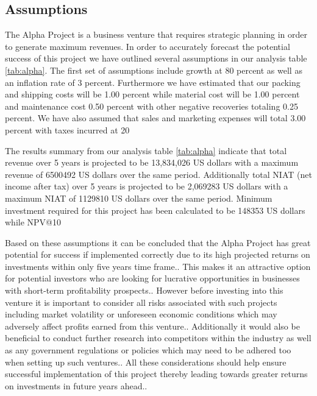 

\subsection{Assumptions}\label{sec:assumptions}
The Alpha Project is a business venture that requires strategic planning in order to generate maximum revenues. In order to accurately forecast the potential success of this project we have outlined several assumptions in our analysis table \ref{tab:alpha}. The first set of assumptions include growth at 80 percent as well as an inflation rate of 3 percent. Furthermore we have estimated that our packing and shipping costs will be 1.00 percent while material cost will be 1.00 percent and maintenance cost 0.50 percent with other negative recoveries totaling 0.25 percent. We have also assumed that sales and marketing expenses will total 3.00 percent with taxes incurred at 20%

The results summary from our analysis table \ref{tab:alpha} indicate that total revenue over 5 years is projected to be 13,834,026 US dollars with a maximum revenue of 6500492 US dollars over the same period. Additionally total NIAT (net income after tax) over 5 years is projected to be 2,069283 US dollars with a maximum NIAT of 1129810 US dollars over the same period. Minimum investment required for this project has been calculated to be 148353 US dollars while NPV@10%

Based on these assumptions it can be concluded that the Alpha Project has great potential for success if implemented correctly due to its high projected returns on investments within only five years time frame.. This makes it an attractive option for potential investors who are looking for lucrative opportunities in businesses with short-term profitability prospects.. However before investing into this venture it is important to consider all risks associated with such projects including market volatility or unforeseen economic conditions which may adversely affect profits earned from this venture.. Additionally it would also be beneficial to conduct further research into competitors within the industry as well as any government regulations or policies which may need to be adhered too when setting up such ventures.. All these considerations should help ensure successful implementation of this project thereby leading towards greater returns on investments in future years ahead..